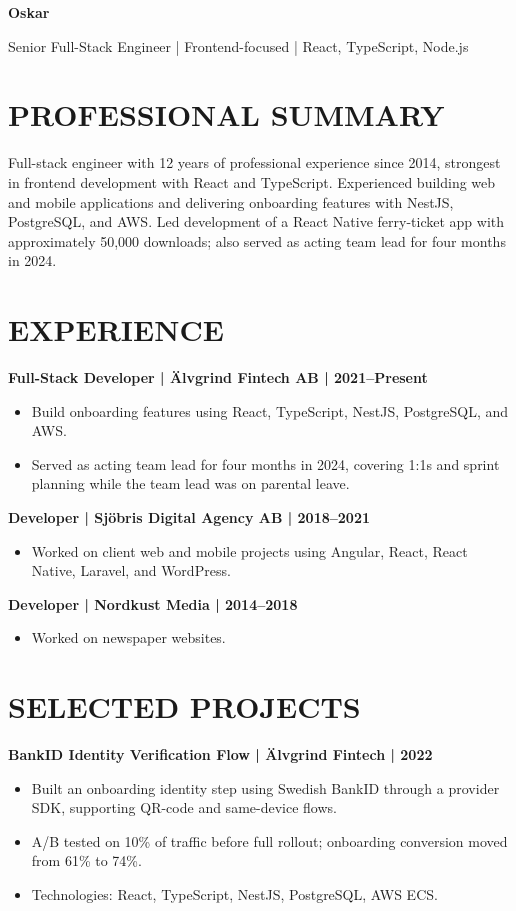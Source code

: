 \documentclass[11pt,a4paper]{article}
\begin{document}
{\centering
{\Huge\bfseries\color{primarycolor} Oskar}\par
\vspace{0.35em}
{\large\color{accentcolor} Senior Full-Stack Engineer | Frontend-focused | React, TypeScript, Node.js}\par
}

\section*{PROFESSIONAL SUMMARY}
Full-stack engineer with 12 years of professional experience since 2014, strongest in frontend development with React and TypeScript. Experienced building web and mobile applications and delivering onboarding features with NestJS, PostgreSQL, and AWS. Led development of a React Native ferry-ticket app with approximately 50,000 downloads; also served as acting team lead for four months in 2024.

\section*{EXPERIENCE}
\textbf{Full-Stack Developer | Älvgrind Fintech AB | 2021–Present}
\begin{itemize}
\item Build onboarding features using React, TypeScript, NestJS, PostgreSQL, and AWS.
\item Served as acting team lead for four months in 2024, covering 1:1s and sprint planning while the team lead was on parental leave.
\end{itemize}

\textbf{Developer | Sjöbris Digital Agency AB | 2018–2021}
\begin{itemize}
\item Worked on client web and mobile projects using Angular, React, React Native, Laravel, and WordPress.
\end{itemize}

\textbf{Developer | Nordkust Media | 2014–2018}
\begin{itemize}
\item Worked on newspaper websites.
\end{itemize}

\section*{SELECTED PROJECTS}
\textbf{BankID Identity Verification Flow | Älvgrind Fintech | 2022}
\begin{itemize}
\item Built an onboarding identity step using Swedish BankID through a provider SDK, supporting QR-code and same-device flows.
\item A/B tested on 10\% of traffic before full rollout; onboarding conversion moved from 61\% to 74\%.
\item Technologies: React, TypeScript, NestJS, PostgreSQL, AWS ECS.
\end{itemize}
\end{document}
